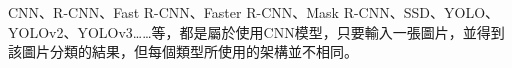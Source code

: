 



CNN、R-CNN、Fast R-CNN、Faster R-CNN、Mask R-CNN、SSD、YOLO、YOLOv2、YOLOv3……等，都是屬於使用CNN模型，只要輸入一張圖片，並得到該圖片分類的結果，但每個類型所使用的架構並不相同。

